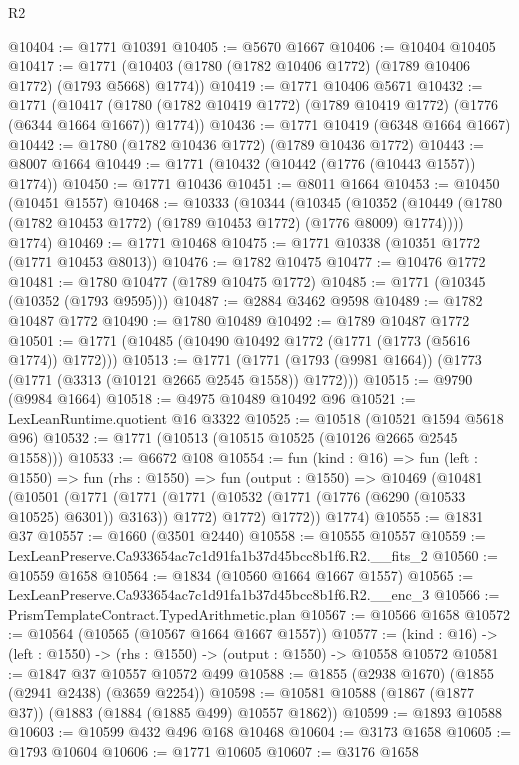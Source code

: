 \begin{lexlean}{R2}
\begin{coremodule}
@10404 := @1771 @10391
@10405 := @5670 @1667
@10406 := @10404 @10405
@10417 := @1771 (@10403 (@1780 (@1782 @10406 @1772) (@1789 @10406 @1772) (@1793 @5668) @1774))
@10419 := @1771 @10406 @5671
@10432 := @1771
    (@10417 (@1780 (@1782 @10419 @1772) (@1789 @10419 @1772) (@1776 (@6344 @1664 @1667)) @1774))
@10436 := @1771 @10419 (@6348 @1664 @1667)
@10442 := @1780 (@1782 @10436 @1772) (@1789 @10436 @1772)
@10443 := @8007 @1664
@10449 := @1771 (@10432 (@10442 (@1776 (@10443 @1557)) @1774))
@10450 := @1771 @10436
@10451 := @8011 @1664
@10453 := @10450 (@10451 @1557)
@10468 := @10333
    (@10344
      (@10345
        (@10352 (@10449 (@1780 (@1782 @10453 @1772) (@1789 @10453 @1772) (@1776 @8009) @1774))))
      @1774)
@10469 := @1771 @10468
@10475 := @1771 @10338 (@10351 @1772 (@1771 @10453 @8013))
@10476 := @1782 @10475
@10477 := @10476 @1772
@10481 := @1780 @10477 (@1789 @10475 @1772)
@10485 := @1771 (@10345 (@10352 (@1793 @9595)))
@10487 := @2884 @3462 @9598
@10489 := @1782 @10487 @1772
@10490 := @1780 @10489
@10492 := @1789 @10487 @1772
@10501 := @1771 (@10485 (@10490 @10492 @1772 (@1771 (@1773 (@5616 @1774)) @1772)))
@10513 := @1771
    (@1771 (@1793 (@9981 @1664)) (@1773 (@1771 (@3313 (@10121 @2665 @2545 @1558)) @1772)))
@10515 := @9790 (@9984 @1664)
@10518 := @4975 @10489 @10492 @96
@10521 := LexLeanRuntime.quotient @16 @3322
@10525 := @10518 (@10521 @1594 @5618 @96)
@10532 := @1771 (@10513 (@10515 @10525 (@10126 @2665 @2545 @1558)))
@10533 := @6672 @108
@10554 := fun (kind : @16) =>
  fun (left : @1550) =>
  fun (rhs : @1550) =>
  fun (output : @1550) =>
  @10469
    (@10481
      (@10501
        (@1771
          (@1771 (@1771 (@10532 (@1771 (@1776 (@6290 (@10533 @10525) @6301)) @3163)) @1772) @1772)
          @1772))
      @1774)
@10555 := @1831 @37
@10557 := @1660 (@3501 @2440)
@10558 := @10555 @10557
@10559 := LexLeanPreserve.Ca933654ac7c1d91fa1b37d45bcc8b1f6.R2.__fits_2
@10560 := @10559 @1658
@10564 := @1834 (@10560 @1664 @1667 @1557)
@10565 := LexLeanPreserve.Ca933654ac7c1d91fa1b37d45bcc8b1f6.R2.__enc_3
@10566 := PrismTemplateContract.TypedArithmetic.plan
@10567 := @10566 @1658
@10572 := @10564 (@10565 (@10567 @1664 @1667 @1557))
@10577 := (kind : @16) -> (left : @1550) -> (rhs : @1550) -> (output : @1550) -> @10558 @10572
@10581 := @1847 @37 @10557 @10572 @499
@10588 := @1855 (@2938 @1670) (@1855 (@2941 @2438) (@3659 @2254))
@10598 := @10581 @10588 (@1867 (@1877 @37)) (@1883 (@1884 (@1885 @499) @10557 @1862))
@10599 := @1893 @10588
@10603 := @10599 @432 @496 @168 @10468
@10604 := @3173 @1658
@10605 := @1793 @10604
@10606 := @1771 @10605
@10607 := @3176 @1658

\end{coremodule}
\end{lexlean}
